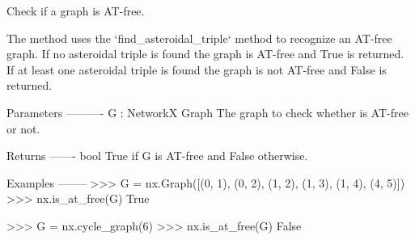 \begin{DoxyVerb}Check if a graph is AT-free.

The method uses the `find_asteroidal_triple` method to recognize
an AT-free graph. If no asteroidal triple is found the graph is
AT-free and True is returned. If at least one asteroidal triple is
found the graph is not AT-free and False is returned.

Parameters
----------
G : NetworkX Graph
    The graph to check whether is AT-free or not.

Returns
-------
bool
    True if G is AT-free and False otherwise.

Examples
--------
>>> G = nx.Graph([(0, 1), (0, 2), (1, 2), (1, 3), (1, 4), (4, 5)])
>>> nx.is_at_free(G)
True

>>> G = nx.cycle_graph(6)
>>> nx.is_at_free(G)
False
\end{DoxyVerb}
 